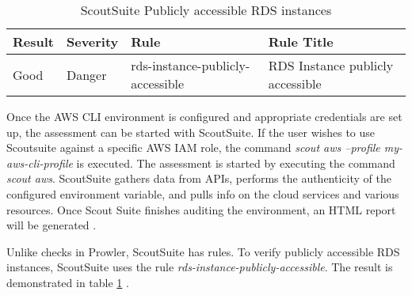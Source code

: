 \begin{table}[h!]
    \begin{center}
        \caption{ScoutSuite Publicly accessible RDS instances}
        \label{tab:scoutsuiterule}
        \begin{tabular}{|p{1.4cm}|p{1.7cm}|p{5.0cm}|p{6.0cm}|}
            \hline
            \textbf{Result} & \textbf{Severity} & \textbf{Rule} & \textbf{Rule Title}\\
            \hline
            Good & Danger & rds-instance-publicly-accessible & RDS Instance publicly accessible \\
            \hline
        \end{tabular}
    \end{center}
\end{table}

Once the AWS CLI environment is configured and appropriate credentials are set up, the assessment can be started with ScoutSuite.
If the user wishes to use Scoutsuite against a specific AWS IAM role, the command \textit{scout aws --profile my-aws-cli-profile} is executed.
The assessment is started by executing the command \textit{scout aws}.
ScoutSuite gathers data from APIs, performs the authenticity of the configured environment variable, and pulls info on the cloud services and various resources.
Once Scout Suite finishes auditing the environment, an HTML report will be generated \cite{77}.

Unlike checks in Prowler, ScoutSuite has rules.
To verify publicly accessible RDS instances, ScoutSuite uses the rule \textit{rds-instance-publicly-accessible}.
The result is demonstrated in table \ref{tab:scoutsuiterule} \cite{77}.






